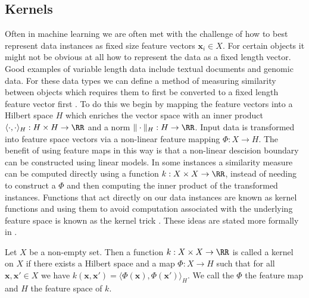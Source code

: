 \subsection*{Kernels}\label{Section1.1}

Often in machine learning we are often met with the challenge of how to best represent data instances as fixed size feature vectors $\bm{x}_i \in X$. For certain objects it might not be obvious at all how to represent the data as a fixed length vector. Good examples of variable length data include textual documents and genomic data. For these data types we can define a method of measuring similarity between objects which requires them to first be converted to a fixed length feature vector first \cite{MurphyKevinP2012Ml}. To do this we begin by mapping the feature vectors into a Hilbert space $H$ which enriches the vector space with an inner product $\langle \cdot , \cdot \rangle_H : H \times H \to \RR$ and a norm $\| \cdot \|_H : H \to \RR$. Input data is transformed into feature space vectors via a non-linear feature mapping $\Phi : X \to H$. The benefit of using feature maps in this way is that a non-linear descision boundary can be constructed using linear models. In some instances a similarity measure can be computed directly using a function $k : X \times X \to \RR$, instead of needing to construct a $\Phi$ and then computing the inner product of the transformed instances. Functions that act directly on our data instances are known as kernel functions and using them to avoid computation associated with the underlying feature space is known as the kernel trick \cite{SteinwartIngo2008SVMb}. These ideas are stated more formally in .

\begin{defe}[Kernel] \label{defe: kernel}
    Let $X$ be a non-empty set. Then a function $k : X \times X \to \RR$ is called a kernel on $X$ if there exists a Hilbert space and a map $\Phi : X \to H$ such that for all $\bm{x} , \bm{x}' \in X$ we have $k \left( \bm{x} , \bm{x}' \right) = \langle \Phi \left( \bm{x} \right), \Phi \left( \bm{x}' \right) \rangle_H$. We call the $\Phi$ the feature map and $H$ the feature space of $k$.
\end{defe}

